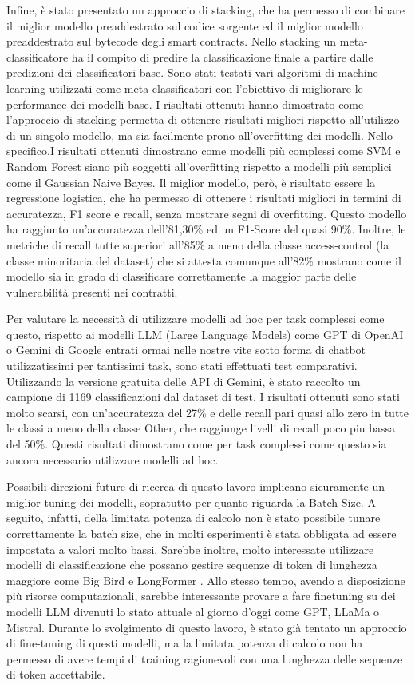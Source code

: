 \documentclass[../../Thesis.tex]{subfiles}
\begin{document}
Infine, è stato presentato un approccio di stacking, che ha permesso di combinare il miglior modello preaddestrato sul codice sorgente ed il miglior modello preaddestrato sul bytecode degli smart contracts. Nello stacking un meta-classificatore ha il compito di predire la classificazione finale a partire dalle predizioni dei classificatori base. Sono stati testati vari algoritmi di machine learning utilizzati come meta-classificatori con l'obiettivo di migliorare le performance dei modelli base. I risultati ottenuti hanno dimostrato come l'approccio di stacking permetta di ottenere risultati migliori rispetto all'utilizzo di un singolo modello, ma sia facilmente prono all'overfitting dei modelli. Nello specifico,I risultati ottenuti dimostrano come modelli più complessi come SVM e Random Forest siano più soggetti all'overfitting rispetto a modelli più semplici come il Gaussian Naive Bayes. Il miglior modello, però, è risultato essere la regressione logistica, che ha permesso di ottenere i risultati migliori in termini di accuratezza, F1 score e recall, senza mostrare segni di overfitting. Questo modello ha raggiunto un'accuratezza dell'81,30\% ed un F1-Score del quasi 90\%. Inoltre, le metriche di recall tutte superiori all'85\% a meno della classe access-control (la classe minoritaria del dataset) che si attesta comunque all'82\% mostrano come il modello sia in grado di classificare correttamente la maggior parte delle vulnerabilità presenti nei contratti.

Per valutare la necessità di utilizzare modelli ad hoc per task complessi come questo, rispetto ai modelli LLM (Large Language Models) come GPT di OpenAI o Gemini di Google entrati ormai nelle nostre vite sotto forma di chatbot utilizzatissimi per tantissimi task, sono stati effettuati test comparativi. Utilizzando la versione gratuita delle API di Gemini, è stato raccolto un campione di 1169 classificazioni dal dataset di test. I risultati ottenuti sono stati molto scarsi, con un'accuratezza del 27\% e delle recall pari quasi allo zero in tutte le classi a meno della classe Other, che raggiunge livelli di recall poco piu bassa del 50\%. Questi risultati dimostrano come per task complessi come questo sia ancora necessario utilizzare modelli ad hoc.

Possibili direzioni future di ricerca di questo lavoro implicano sicuramente un miglior tuning dei modelli, sopratutto per quanto riguarda la Batch Size. A seguito, infatti, della limitata potenza di calcolo non è stato possibile tunare correttamente la batch size, che in molti esperimenti è stata obbligata ad essere impostata a valori molto bassi. Sarebbe inoltre, molto interessate utilizzare modelli di classificazione che possano gestire sequenze di token di lunghezza maggiore come Big Bird \cite{BigBird} e LongFormer \cite{Longformer}. Allo stesso tempo, avendo a disposizione più risorse computazionali, sarebbe interessante provare a fare finetuning su dei modelli LLM divenuti lo stato attuale al giorno d'oggi come GPT, LLaMa o Mistral. Durante lo svolgimento di questo lavoro, è stato già tentato un approccio di fine-tuning di questi modelli, ma la limitata potenza di calcolo non ha permesso di avere tempi di training ragionevoli con una lunghezza delle sequenze di token accettabile. 
\end{document}
